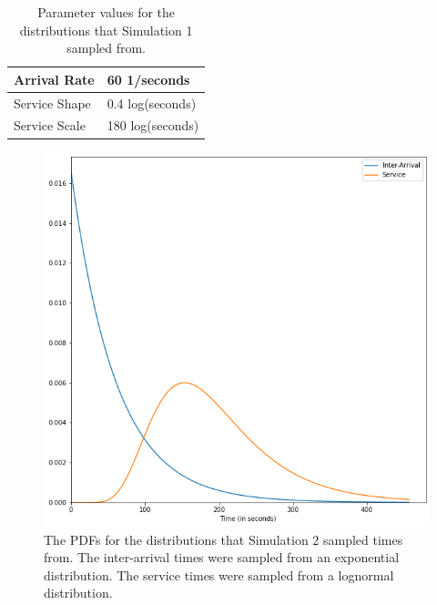 \begin{table}
  \begin{tabular}{|l|l|}
    \hline
    Arrival Rate & 60 1/seconds\\
    \hline
    Service Shape & 0.4 log(seconds)\\
    \hline
    Service Scale & 180 log(seconds)\\
    \hline
  \end{tabular}
  \caption{Parameter values for the distributions that Simulation 1 sampled
    from.}\label{tab:sim2_params}
\end{table}

\begin{figure}[H]
  \includegraphics[width=\textwidth]{figures/montecarlo/expon_lognorm.png}
  \caption{
    The PDFs for the distributions that Simulation 2
    sampled times from.
    The inter-arrival times were sampled from an exponential distribution.
    The service times were sampled from a lognormal distribution.
  }\label{fig:simple_sim2_dists}
\end{figure}


